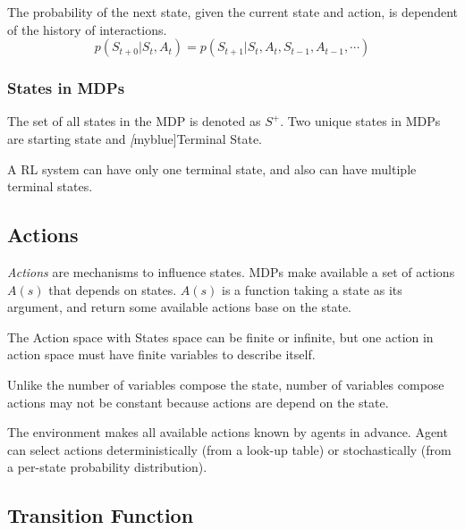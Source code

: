 \begin{definition}
  The probability of the next state, given the current state and action, is dependent of the history of interactions.
  \begin{equation}
    p(S_{t+0}|S_t, A_t) = p(S_{t+1}|S_t, A_t, S_{t-1}, A_{t-1}, \cdots)
  \end{equation}
\end{definition}

\subsubsection*{States in MDPs} The set of all states in the MDP is denoted as $S^+$. Two unique states in MDPs are
starting state and \emph[myblue]{Terminal State}.

A RL system can have only one terminal state, and also can have multiple terminal states.

\subsection{Actions}

\emph{Actions} are mechanisms to influence states. MDPs make available a set of actions $A(s)$ that depends on states.
$A(s)$ is a function taking a state as its argument, and return some available actions base on the state. \par The
Action space with States space can be finite or infinite, but one action in action space must have finite variables to
describe itself. \par Unlike the number of variables compose the state, number of variables compose actions may not be
constant because actions are depend on the state. \par The environment makes all available actions known by agents in
advance. Agent can select actions deterministically (from a look-up table) or stochastically (from a per-state
probability distribution).

\subsection{Transition Function}

